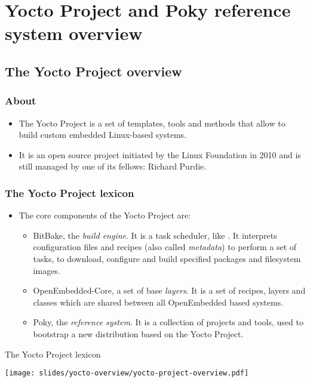\section{Yocto Project and Poky reference system overview}

\subsection{The Yocto Project overview}

\begin{frame}
  \frametitle{About}
  \begin{itemize}
  \item The Yocto Project is a set of templates, tools and methods
        that allow to build custom embedded Linux-based systems.
  \item It is an open source project initiated by the Linux Foundation
        in 2010 and is still managed by one of its fellows: Richard
        Purdie.
  \end{itemize}
\end{frame}

\begin{frame}
  \frametitle{The Yocto Project lexicon}
  \begin{itemize}
  \item The core components of the Yocto Project are:
    \begin{itemize}
      \item BitBake, the {\em build engine}. It is a task scheduler,
        like . It interprets configuration files and
        recipes (also called {\em metadata}) to perform a set of
        tasks, to download, configure and build specified packages and
        filesystem images.
      \item OpenEmbedded-Core, a set of base {\em layers}. It is a set
        of recipes, layers and classes which are shared between all
        OpenEmbedded based systems.
      \item Poky, the {\em reference system}. It is a collection of
        projects and tools, used to bootstrap a new distribution based
        on the Yocto Project.
    \end{itemize}
  \end{itemize}
\end{frame}

\begin{frame}{The Yocto Project lexicon}
  \begin{center}
    \texttt{[image: slides/yocto-overview/yocto-project-overview.pdf]}
  \end{center}
\end{frame}

